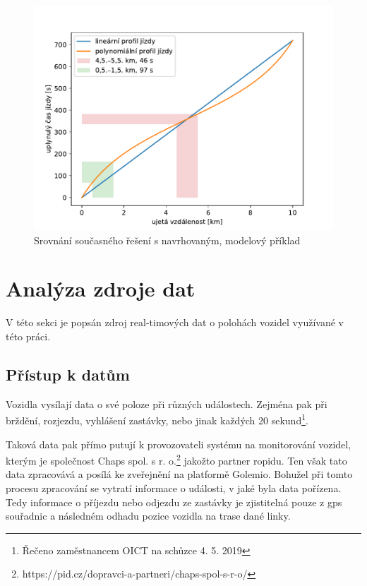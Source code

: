 \begin{figure}
	\centering
  \includegraphics[width=\linewidth]{../img/lin_vs_poly}
  \caption{Srovnání současného řešení s navrhovaným, modelový příklad}
  \label{fig:lin_vs_poly}
\end{figure}

\section{Analýza zdroje dat} \label{chapter:analyza_zdroje}

V této sekci je popsán zdroj real-timových dat o polohách vozidel využívané v této práci.

\subsection{Přístup k datům}

Vozidla vysílají data o své poloze při různých událostech. Zejména pak při brždění, rozjezdu, vyhlášení zastávky, nebo jinak každých 20 sekund\footnote{Řečeno zaměstnancem OICT na schůzce 4. 5. 2019}.

\bigbreak

Taková data pak přímo putují k provozovateli systému na monitorování vozidel, kterým je společnost Chaps spol. s r. o.\footnote{https://pid.cz/dopravci-a-partneri/chaps-spol-s-r-o/} jakožto partner \gls{ropid}u. Ten však tato data zpracovává a posílá ke zveřejnění na platformě Golemio. Bohužel při tomto procesu zpracování se vytratí informace o události, v jaké byla data pořízena. Tedy informace o příjezdu nebo odjezdu ze zastávky je zjistitelná pouze z \gls{gps} souřadnic a následném odhadu pozice vozidla na trase dané linky.

